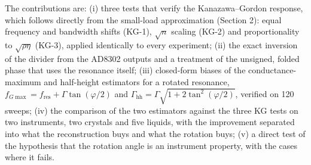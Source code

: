 \documentclass[11pt,a4paper]{article}
\begin{document}
The contributions are: (i) three tests that verify the Kanazawa--Gordon response, which follows directly from the small-load approximation (Section 2): equal frequency and bandwidth shifts (KG-1), $\sqrt n$ scaling (KG-2) and proportionality to $\sqrt{\rho\eta}$ (KG-3), applied identically to every experiment; (ii) the exact inversion of the divider from the AD8302 outputs and a treatment of the unsigned, folded phase that uses the resonance itself; (iii) closed-form biases of the conductance-maximum and half-height estimators for a rotated resonance, $f_{G\max} = f_\mathrm{res} + \Gamma\tan(\varphi/2)$ and $\Gamma_\mathrm{hh} = \Gamma\sqrt{1 + 2\tan^2(\varphi/2)}$, verified on 120 sweeps; (iv) the comparison of the two estimators against the three KG tests on two instruments, two crystals and five liquids, with the improvement separated into what the reconstruction buys and what the rotation buys; (v) a direct test of the hypothesis that the rotation angle is an instrument property, with the cases where it fails.
\end{document}
